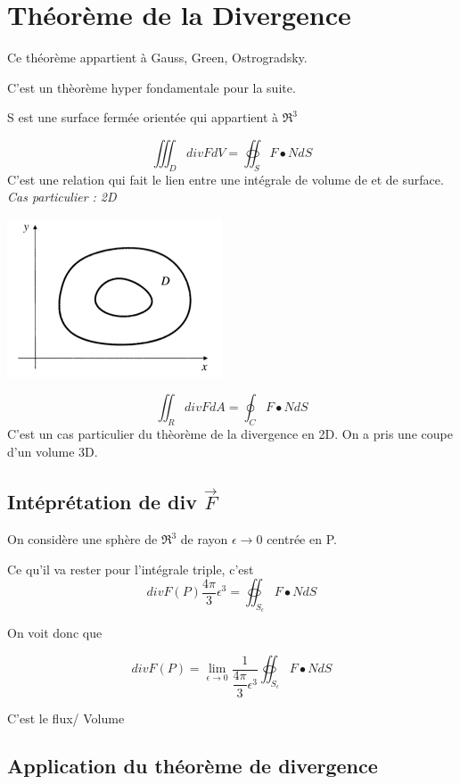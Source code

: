 \section{Théorème de la Divergence}
Ce théorème appartient à Gauss, Green, Ostrogradsky.

C'est un thèorème hyper fondamentale pour la suite.

S est une surface fermée orientée qui appartient à $\Re^3$

\[\iiint_D div F dV = \oiint_S F \bullet N dS\]
C'est une relation qui fait le lien entre une intégrale de volume de et de surface.
\textit{
Cas particulier : 2D}

\begin{center}
\includegraphics[scale=0.5]{image5.png}\\

\end{center}

\[\iint _R div F dA = \oint _C F \bullet N dS\]
C'est un cas particulier du thèorème de la divergence en 2D. On a pris une coupe d'un volume 3D.

\subsection{Intéprétation de div $\vec F$}

On considère une sphère de $\Re ^3$ de rayon $\epsilon \to 0$ centrée en P.

Ce qu'il va rester pour l'intégrale triple, c'est
\[div F(P) \dfrac{4\pi}{3} \epsilon^3 = \oiint _{S_{\epsilon}} F \bullet N dS \]

On voit donc que

$$div F (P) =  \lim_{\epsilon \to 0 } \frac{1}{\dfrac{4\pi}{3} \epsilon^3} \oiint _{S_{\epsilon}} F \bullet N dS $$

C'est le flux/ Volume

\subsection{Application du théorème de divergence}

